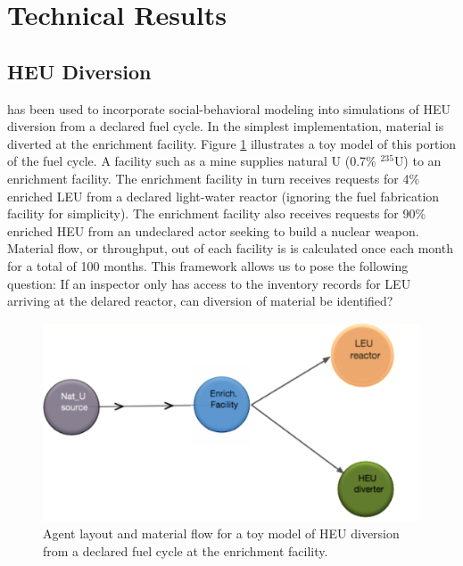 \section{Technical Results}
\label{s_results}

\subsection{\gls{HEU} Diversion}
\label{s_heu}
\Cyclus has been used to incorporate social-behavioral modeling into simulations
of \gls{HEU} diversion from a declared fuel cycle.  In the simplest implementation, material is diverted at the enrichment facility.  Figure \ref{fig:heu_layout} illustrates a toy model of this portion of the fuel cycle. A facility such as a mine supplies natural \gls{U} (0.7\% $^{235}$U) to an enrichment facility.  The enrichment facility in turn receives requests for 4\% enriched \gls{LEU} from a declared light-water reactor (ignoring the fuel fabrication facility for simplicity).  The enrichment facility also receives requests for 90\% enriched \gls{HEU} from an undeclared actor seeking to build a nuclear weapon. Material flow, or throughput, out of each facility is is calculated once each month for a total of 100 months.  This framework allows us to pose the following question: If an inspector only has access to the inventory records for LEU arriving at the delared reactor, can diversion of material be identified?

\begin{figure}%
\begin{center}
\includegraphics[natwidth=162bp,natheight=227bp, scale=0.7]{./figs/heu_cyclist_layout.png}
\end{center}
\caption{Agent layout and material flow for a toy model of \gls{HEU} diversion from a declared fuel cycle at the enrichment facility.}
\label{fig:heu_layout}
\end{figure}

